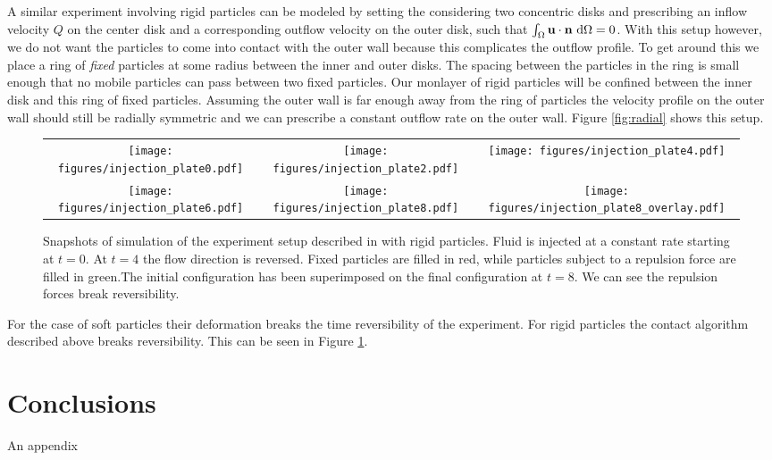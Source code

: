 \documentclass[preprint, 10pt]{elsarticle}
\begin{document}
A similar experiment involving rigid particles can be modeled by setting the
considering two concentric disks and prescribing an inflow velocity $Q$ on the
center disk and a corresponding outflow velocity on the outer disk, such that
$\int_\Omega {\mathbf{u}}\cdot{\mathbf{n}}~\text{d}\Omega = 0$. With this setup however, we do not want the particles to come into contact with the outer wall because this
complicates the outflow profile. To get around this we place a ring of
\textit{fixed} particles at some radius between the inner and outer disks. The
spacing between the particles in the ring is small enough that no mobile
particles can pass between two fixed particles. Our monlayer of rigid particles
will be confined between the inner disk and this ring of fixed particles.
Assuming the outer wall is far enough away from the ring of particles the
velocity profile on the outer wall should still be radially symmetric and we can prescribe a constant outflow rate on the outer wall. Figure \ref{fig:radial}
shows this setup.

\begin{figure}[h!]
\begin{tabular}{c c c}
\texttt{[image: figures/injection\_plate0.pdf]}&
\texttt{[image: figures/injection\_plate2.pdf]}&
\texttt{[image: figures/injection\_plate4.pdf]}\\
\texttt{[image: figures/injection\_plate6.pdf]}&
\texttt{[image: figures/injection\_plate8.pdf]}&
\texttt{[image: figures/injection\_plate8\_overlay.pdf]}\\
\end{tabular}
\caption{Snapshots of simulation of the experiment setup described in
\cite{MacMinn2015} with rigid particles. Fluid is injected at a constant rate
starting at $t=0$. At $t=4$ the flow direction is reversed. Fixed particles are
filled in red, while particles subject to a repulsion force are filled in
green.The initial configuration has been superimposed on the final configuration at $t=8$. We can see the repulsion forces break reversibility.}
\label{fig:macminn}
\end{figure}


For the case of soft particles their deformation breaks the time reversibility
of the experiment. For rigid particles the contact algorithm described above
breaks reversibility. This can be seen in Figure \ref{fig:macminn}.
\FloatBarrier
\section{Conclusions\label{s:conclusions}}


\begin{appendices}
An appendix
\end{appendices}


 

\end{document}
